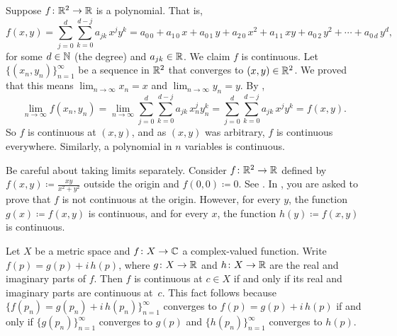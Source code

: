\begin{example}
Suppose $f \colon {\mathbb{R}}^2 \to {\mathbb{R}}$ is a polynomial.  That is,
\begin{equation*}
f(x,y) =
\sum_{j=0}^d
\sum_{k=0}^{d-j}
a_{jk}\,x^jy^k =
a_{0\,0} + a_{1\,0} \, x +
a_{0\,1} \, y+  
a_{2\,0} \, x^2+  
a_{1\,1} \, xy+  
a_{0\,2} \, y^2+ \cdots +
a_{0\,d} \, y^d ,
\end{equation*}
for some $d \in {\mathbb{N}}$ (the degree) and $a_{jk} \in {\mathbb{R}}$.  We claim 
$f$ is continuous.  Let $\bigl\{ (x_n,y_n) \bigr\}_{n=1}^\infty$ be a sequence
in ${\mathbb{R}}^2$ that converges to $(x,y) \in {\mathbb{R}}^2$.  We proved that this
means $\lim_{n\to\infty} x_n = x$ and $\lim_{n\to\infty} y_n = y$.
By ,
\begin{equation*}
\lim_{n\to\infty}
f(x_n,y_n) =
\lim_{n\to\infty}
\sum_{j=0}^d
\sum_{k=0}^{d-j}
a_{jk} \, x_n^jy_n^k 
=
\sum_{j=0}^d
\sum_{k=0}^{d-j}
a_{jk} \, x^jy^k
=
f(x,y) .
\end{equation*}
So $f$ is continuous at $(x,y)$, and as $(x,y)$ was arbitrary, $f$ is
continuous everywhere.  Similarly, a
polynomial in $n$ variables is continuous.
\end{example}

Be careful about taking limits separately.
Consider $f \colon {\mathbb{R}}^2 \to {\mathbb{R}}$ defined by $f(x,y) \coloneqq \frac{xy}{x^2+y^2}$
outside the origin and $f(0,0) \coloneqq 0$.
See .
In ,
you are asked to prove that $f$ is not continuous at the origin.
However, for every $y$, the function $g(x) \coloneqq f(x,y)$ is
continuous,
and for every $x$, the function $h(y) \coloneqq f(x,y)$ is continuous.
\begin{myfigureht}
\caption{Graph of $\frac{xy}{x^2+y^2}$.\label{fig:xyxsqysq}}
\end{myfigureht}

\begin{example}
Let $X$ be a metric space and $f \colon X \to {\mathbb{C}}$ a complex-valued
function.  Write $f(p) = g(p) + i \, h(p)$, where $g \colon X \to {\mathbb{R}}$
and $h \colon X \to {\mathbb{R}}$ are the real and imaginary parts of $f$.
Then $f$ is continuous at $c \in X$ if and only if its real
and imaginary parts are continuous at~$c$.  
This fact follows because $\bigl\{ f(p_n) = g(p_n) + i \, h(p_n) \bigr\}_{n=1}^\infty$
converges to $f(p) = g(p) + i \, h(p)$ if and only if
$\bigl\{ g(p_n) \bigr\}_{n=1}^\infty$ converges to $g(p)$ and
$\bigl\{ h(p_n) \bigr\}_{n=1}^\infty$ converges to $h(p)$.
\end{example}

